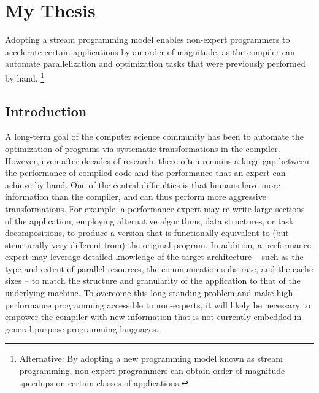 \chapter{My Thesis}



Adopting a stream programming model enables non-expert programmers to
accelerate certain applications by an order of magnitude, as the
compiler can automate parallelization and optimization tasks that were
previously performed by hand.
%
\footnote{Alternative: 
By adopting a new programming model known as stream programming,
non-expert programmers can obtain order-of-magnitude speedups on
certain classes of applications.
}

\section{Introduction}

A long-term goal of the computer science community has been to
automate the optimization of programs via systematic transformations
in the compiler.  However, even after decades of research, there often
remains a large gap between the performance of compiled code and the
performance that an expert can achieve by hand.  One of the central
difficulties is that humans have more information than the compiler,
and can thus perform more aggressive transformations.  For example, a
performance expert may re-write large sections of the application,
employing alternative algorithms, data structures, or task
decompositions, to produce a version that is functionally equivalent
to (but structurally very different from) the original program.  In
addition, a performance expert may leverage detailed knowledge of the
target architecture -- such as the type and extent of parallel
resources, the communication substrate, and the cache sizes -- to
match the structure and granularity of the application to that of the
underlying machine.  To overcome this long-standing problem and make
high-performance programming accessible to non-experts, it will likely
be necessary to empower the compiler with new information that is not
currently embedded in general-purpose programming languages.

